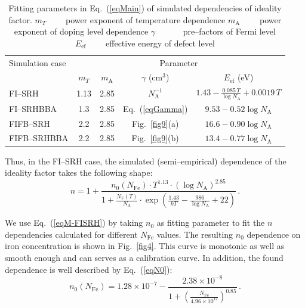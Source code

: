 \documentclass [sort&compress] {elsarticle}
\begin{document}
\begin{table}
\caption{\label{tabEq}Fitting parameters in Eq.~(\ref{eqMain}) of simulated dependencies of ideality factor. \newline
$m_T\qquad$ power exponent of temperature dependence  \newline
$m_\mathrm{A}\qquad$ power exponent of doping level dependence\newline
$\gamma\quad\qquad$  pre--factors of Fermi level\newline
$E_\mathrm{ef}\qquad$  effective energy of defect level
}
\begin{tabular}{lcccc}
\hline
\hline
Simulation case&\multicolumn{4}{c}{Parameter}\\
&$m_T$&$m_\mathrm{A}$&$\gamma$ (cm$^3$)&$E_\mathrm{ef}$ (eV)\\
\hline
FI--SRH&1.13&2.85&$N_\mathrm{A}^{-1}$&$1.43-\frac{0.085\, T} {\log N_\mathrm{A}}+0.0019 \,T$\\
FI--SRHBBA&1.3&2.85&Eq.~(\ref{eqGamma})&$9.53-0.52\log N_\mathrm{A}$\\
FIFB--SRH&2.2&2.85&Fig.~\ref{fig9}(a)&$16.6-0.90\log N_\mathrm{A}$\\
FIFB--SRHBBA&2.2&2.85&Fig.~\ref{fig9}(b)&$13.4-0.77\log N_\mathrm{A}$\\
\hline
\hline
\end{tabular}
\end{table}


Thus, in the FI--SRH case, the simulated (semi--empirical) dependence of the ideality factor takes the following shape:
\begin{equation}
\label{eqM-FISRH}
    n=1+\frac{n_0(N_\mathrm{Fe})\cdot T^{1.13}\cdot(\log N_\mathrm{A})^{2.85}}
        {1+\frac{N_V(T)}{N_\mathrm{A}}\cdot\exp\left(\frac{1.43}{kT}-\frac{986}{\log N_\mathrm{A}}+22\right)}\,.
\end{equation}

We use Eq.~(\ref{eqM-FISRH}) by taking $n_0$ as fitting parameter to fit the $n$ dependencies calculated for different $N_\mathrm{Fe}$ values.
The resulting $n_0$ dependence on iron concentration is shown in Fig.~\ref{fig4}.
This curve is monotonic as well as smooth enough and can serves as a calibration curve.
In addition, the found dependence is well described by Eq.~(\ref{eqN0}):
\begin{equation}
\label{eqN0}
    n_0(N_\mathrm{Fe})=1.28\times10^{-7}-\frac{2.38\times10^{-8}}{1+\left(\frac{N_\mathrm{Fe}}{4.96\times10^{12}}\right)^{0.85}}\,.
\end{equation}
\end{document}
